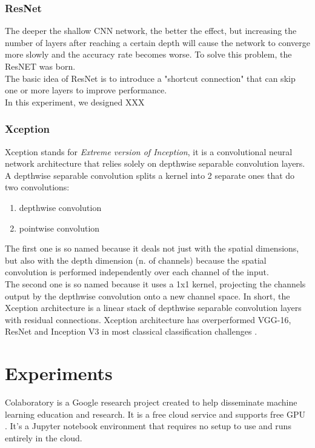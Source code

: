 \documentclass[conference]{IEEEtran}
\begin{document}
\subsubsection{ResNet}
The deeper the shallow CNN network, the better the effect, but increasing the number of layers after reaching a certain depth will cause the network to converge more slowly and the accuracy rate becomes worse. To solve this problem, the ResNET was born.\\
The basic idea of ResNet is to introduce a "shortcut connection" that can skip one or more layers to improve performance.\\
In this experiment, we designed XXX

\subsubsection{Xception}%
Xception stands for \textit{Extreme version of Inception}, it is a convolutional neural network architecture that relies solely on depthwise separable convolution layers.
A depthwise separable convolution splits a kernel into 2 separate ones that do two convolutions: 
\begin{enumerate}
    \item depthwise convolution
    \item pointwise convolution
\end{enumerate}
The first one is so named because it deals not just with the spatial dimensions, but also with the depth dimension (n. of channels) because the spatial convolution is performed independently over each channel of the input.\\
The second one is so named because it uses a 1x1 kernel, projecting the channels output by the depthwise convolution onto a new channel space.
In short, the Xception architecture is a linear stack of
depthwise separable convolution layers with residual connections.
Xception architecture has overperformed VGG-16, ResNet and Inception V3 in most classical classification challenges \cite{xception}.


\section{Experiments}
Colaboratory is a Google research project created to help disseminate machine learning education and research. It is a free cloud service and supports free GPU . It's a Jupyter notebook environment that requires no setup to use and runs entirely in the cloud.
\end{document}
